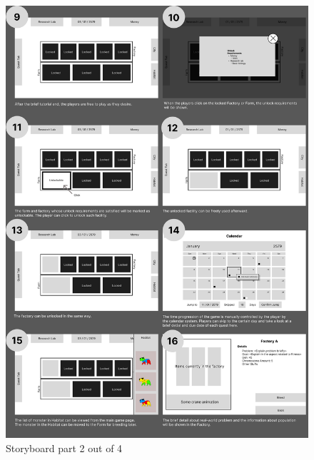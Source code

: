 \documentclass[12pt,oneside,openright,a4paper]{cpe-english-project}
\begin{document}
\begin{figure}[!h]\centering \includegraphics[width=14cm]{appendix-a-figure/storyboard2.png} \caption{Storyboard part 2 out of 4} \end{figure}
\newpage
\end{document}
